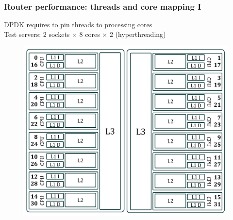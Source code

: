 \begin{frame}[fragile]
  \frametitle{Router performance: threads and core mapping I}
  DPDK requires to pin threads to processing cores\\
  Test servers: 2 sockets $\times$ 8 cores $\times$ 2 (hyperthreading)

  \begin{figure}
    \includegraphics[height=.7\textheight]{img/cpus_horiz.pdf}
  \end{figure}
\end{frame}

